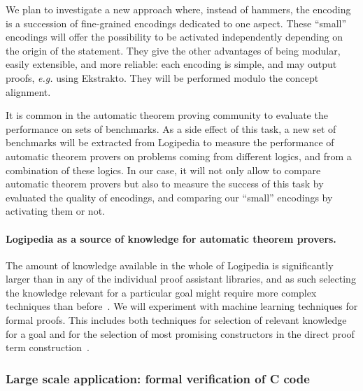 We plan to investigate a new approach where, instead of hammers, the
encoding is a succession of fine-grained encodings dedicated to one
aspect. These ``small'' encodings will offer the possibility to be
activated independently depending on the origin of the statement. They
give the other advantages of being modular, easily extensible, and
more reliable: each encoding is simple, and may output proofs, {\em
  e.g.} using Ekstrakto. They will be performed modulo the concept
alignment.

It is common in the automatic theorem proving community to evaluate
the performance on sets of benchmarks. As a side effect of this task,
a new set of benchmarks will be extracted from Logipedia to measure
the performance of automatic theorem provers on problems coming from
different logics, and from a combination of these logics. In our case,
it will not only allow to compare automatic theorem provers but also
to measure the success of this task by evaluated the quality of
encodings, and comparing our ``small'' encodings by activating them or
not.

\paragraph*{Logipedia as a source of knowledge for automatic theorem provers.}
The amount of knowledge available in the whole of Logipedia is
significantly larger than in any of the individual proof assistant
libraries, and as such selecting the knowledge relevant for a
particular goal might require more complex techniques than
before~\cite{Irving-deepmath}.  We will experiment with machine
learning techniques for formal proofs. This includes both techniques
for selection of relevant knowledge for a goal and for the selection
of most promising constructors in the direct proof term
construction~\cite{ZielenkiewiczSchubert2016}.

\subsubsection*{Large scale application: formal verification of C code}

